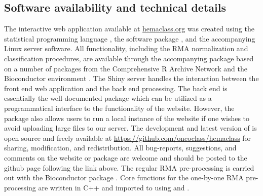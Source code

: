 \documentclass{article}
\begin{document}
\subsection{Software availability and technical details}
The interactive web application available at \url{hemaclass.org} was created using the statistical programming language \R{} \citep{RCoreTeam}, the software package  \citep{shiny}, and the accompanying Linux server software.
All \hemaClass{} functionality, including the RMA normalization and classification procedures, are available through the accompanying package  based on a number of packages from the Comprehensive R Archive Network \citep{RCoreTeam} and the Bioconductor environment \citep{Gentleman2004}.
The Shiny server handles the interaction between the front end web application and the back end \R{} processing.
The back end is essentially the well-documented  package which can be utilized as a programmatical interface to the functionality of the website.
However, the package also allows users to run a local instance of the website if one wishes to avoid uploading large files to our server.
The development and latest version of  is open source and freely available at \url{https://github.com/oncoclass/hemaclass} for sharing, modification, and redistribution.
All bug-reports, suggestions, and comments on the website or package are welcome and should be posted to the github page following the link above.
The regular RMA pre-processing is carried out with the Bioconductor package  \citep{Gautier2004}.
Core functions for the one-by-one RMA pre-processing are written in \textsf{C++} and imported to \R{} using  and  \citep{Rcpp2013,Eddelbuettel2011,RcppArmadillo,Sanderson2010}.
\end{document}
